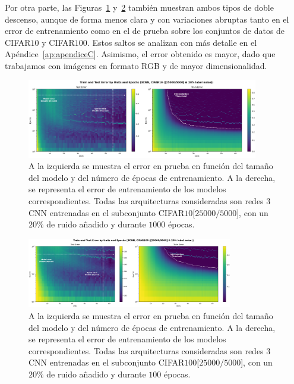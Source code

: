 Por otra parte, las Figuras~\ref{fig:model-epoch3CNNCIFAR10} y~\ref{fig:model-epoch3CNNCIFAR10025k} también muestran ambos tipos de doble descenso, aunque de forma menos clara y con variaciones abruptas tanto en el error de entrenamiento como en el de prueba sobre los conjuntos de datos de CIFAR$10$ y CIFAR$100$. Estos saltos se analizan con más detalle en el Apéndice~\ref{ap:apendiceC}. Asimismo, el error obtenido es mayor, dado que trabajamos con imágenes en formato RGB y de mayor dimensionalidad.\newline

\begin{figure}[h]
    \centering
    \includegraphics[width=0.9\textwidth]{img/experiments/model-epoch3CNNCIFAR10.png}
    \caption[Doble descenso en función del tamaño del modelo y del número de épocas para la red $3$CNN y un subconjunto de CIFAR$10$.]{A la izquierda se muestra el error en prueba en función del tamaño del modelo y del número de épocas de entrenamiento. A la derecha, se representa el error de entrenamiento de los modelos correspondientes. Todas las arquitecturas consideradas son redes $3$CNN entrenadas en el subconjunto CIFAR$10$[$25000/5000$], con un $20\%$ de ruido añadido y durante $1000$ épocas.}\label{fig:model-epoch3CNNCIFAR10}
\end{figure}

\begin{figure}[h]
    \centering
    \includegraphics[width=0.8\textwidth]{img/experiments/model-epoch3CNNCIFAR10025k.png}
    \caption[Doble descenso en función del tamaño del modelo y del número de épocas para la red $3$CNN y un subconjunto de CIFAR$100$.]{A la izquierda se muestra el error en prueba en función del tamaño del modelo y del número de épocas de entrenamiento. A la derecha, se representa el error de entrenamiento de los modelos correspondientes. Todas las arquitecturas consideradas son redes $3$CNN entrenadas en el subconjunto CIFAR$100$[$25000/5000$], con un $20\%$ de ruido añadido y durante $100$ épocas.}\label{fig:model-epoch3CNNCIFAR10025k}
\end{figure}

